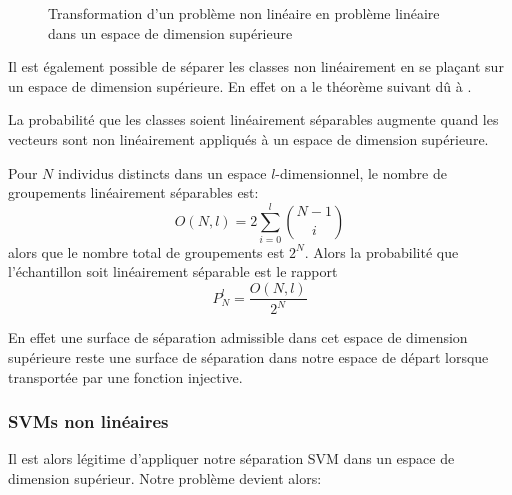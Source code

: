 \begin{figure}[htbp]
\caption{Transformation d'un problème non linéaire en problème linéaire dans un espace de dimension supérieure}
\end{figure}

Il est également possible de séparer les classes non linéairement en se plaçant sur un espace de dimension supérieure. En effet on a le théorème suivant dû à \citet{Cover1965}.

\begin{theoreme}[Cover]
La probabilité que les classes soient linéairement séparables augmente quand les vecteurs sont non linéairement appliqués à un espace de dimension supérieure.
\end{theoreme}

\begin{hproof}
Pour $N$ individus distincts dans un espace $l$-dimensionnel, le nombre de groupements linéairement séparables est:
\begin{equation*}
    O(N,l) = 2 \sum_{i=0}^l \binom{N-1}{i}
\end{equation*}
alors que le nombre total de groupements est $2^N$. Alors la probabilité que l'échantillon soit linéairement séparable est le rapport
\begin{equation*}
    P^l_N = \frac{O(N,l)}{2^N}
\end{equation*}
\end{hproof}


En effet une surface de séparation admissible dans cet espace de dimension supérieure reste une surface de séparation dans notre espace de départ lorsque transportée par une fonction injective.

\subsubsection{SVMs non linéaires}
Il est alors légitime d'appliquer notre séparation SVM dans un espace de dimension supérieur. Notre problème devient alors:

